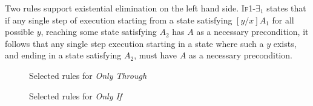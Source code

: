 Two rules support existential elimination on the left hand side. %
\textsc{If1-$\exists_1$} states that if any single step of execution starting
from a state satisfying $[y/x]A_1$ for all possible $y$, reaching some state satisfying
$A_2$ has $A$ as a necessary precondition, it follows that any single step execution
starting in a state where such a $y$ exists, and ending in a state satisfying $A_2$,
must have $A$ as a necessary precondition.   %



\begin{figure}[t]
\footnotesize
{}
\caption{Selected rules for \emph{Only Through}%
}
\label{f:only-through}
\end{figure}
\begin{figure}[t]
\footnotesize
{}
\caption{Selected rules for \emph{Only If}%
}
\label{f:only-if}
\end{figure}




